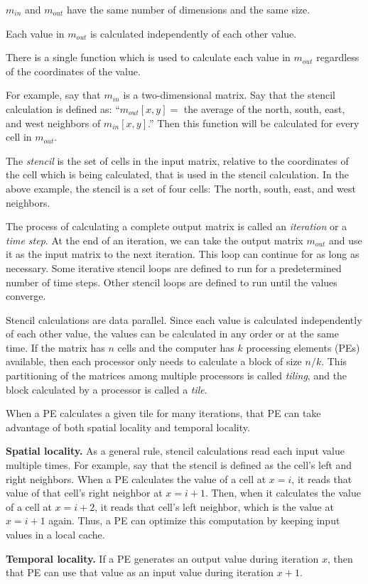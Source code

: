 \documentclass{styles/sig-alternate}
\begin{document}
\begin{enumerate*}
\item $m_{in}$ and $m_{out}$ have the same number of dimensions and
  the same size.
\item Each value in $m_{out}$ is calculated independently of each
  other value.
\item There is a single function which is used to calculate each value
  in $m_{out}$ regardless of the coordinates of the value.
\end{enumerate*}

For example, say that $m_{in}$ is a two-dimensional matrix.  Say that
the stencil calculation is defined as: ``$m_{out}[x, y] =$ the average
of the north, south, east, and west neighbors of $m_{in}[x, y]$.''
Then this function will be calculated for every cell in $m_{out}$.

The {\em stencil} is the set of cells in the input matrix, relative to
the coordinates of the cell which is being calculated, that is used in
the stencil calculation.  In the above example, the stencil is a set
of four cells: The north, south, east, and west neighbors.

The process of calculating a complete output matrix is called an {\em
  iteration} or a {\em time step}.  At the end of an iteration, we can
take the output matrix $m_{out}$ and use it as the input matrix to the
next iteration.  This loop can continue for as long as necessary.
Some iterative stencil loops are defined to run for a predetermined
number of time steps.  Other stencil loops are defined to run until
the values converge.

Stencil calculations are data parallel.  Since each value is
calculated independently of each other value, the values can be
calculated in any order or at the same time.  If the matrix has $n$
cells and the computer has $k$ processing elements (PEs) available,
then each processor only needs to calculate a block of size $n/k$.  This
partitioning of the matrices among multiple processors is called
{\em tiling}, and the block calculated by a processor is called a
{\em tile}.

When a PE calculates a given tile for many iterations, that PE can
take advantage of both spatial locality and temporal locality.
\begin{itemize*}
\item {\bf Spatial locality.} As a general rule, stencil calculations
  read each input value multiple times.  For example, say that the
  stencil is defined as the cell's left and right neighbors.  When a
  PE calculates the value of a cell at $x=i$, it reads that value of
  that cell's right neighbor at $x=i+1$.  Then, when it calculates the
  value of a cell at $x=i+2$, it reads that cell's left neighbor, which
  is the value at $x=i+1$ again.  Thus, a PE can optimize this
  computation by keeping input values in a local cache.
\item {\bf Temporal locality.} If a PE generates an output value
  during iteration $x$, then that PE can use that value as an input
  value during iteration $x+1$.
\end{itemize*}
\end{document}
